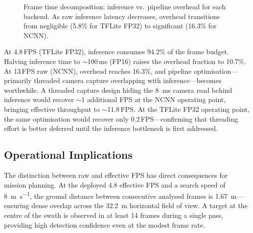 \begin{figure}[ht]
  \centering
  \caption{Frame time decomposition: inference vs.\ pipeline overhead for each backend.  As raw inference latency decreases, overhead transitions from negligible (5.8\% for TFLite FP32) to significant (16.3\% for NCNN).}\label{fig:bottleneck_shift}
\end{figure}

At 4.8\,FPS (TFLite FP32), inference consumes 94.2\% of the frame budget.  Halving inference time to ${\sim}$100\,ms (FP16) raises the overhead fraction to 10.7\%.  At 13\,FPS raw (NCNN), overhead reaches 16.3\%, and pipeline optimisation---primarily threaded camera capture overlapping with inference---becomes worthwhile.  A threaded capture design hiding the \SI{8}{\milli\second} camera read behind inference would recover ${\sim}$1 additional FPS at the NCNN operating point, bringing effective throughput to ${\sim}$11.8\,FPS.  At the TFLite FP32 operating point, the same optimisation would recover only 0.2\,FPS---confirming that threading effort is better deferred until the inference bottleneck is first addressed.

\subsection{Operational Implications}\label{sec:cv:pipeline-fps:ops}

The distinction between raw and effective FPS has direct consequences for mission planning.  At the deployed 4.8 effective FPS and a search speed of \SI{8}{\metre\per\second}, the ground distance between consecutive analysed frames is \SI{1.67}{\metre}---ensuring dense overlap across the \SI{32.2}{\metre} horizontal field of view.  A target at the centre of the swath is observed in at least 14 frames during a single pass, providing high detection confidence even at the modest frame rate.

